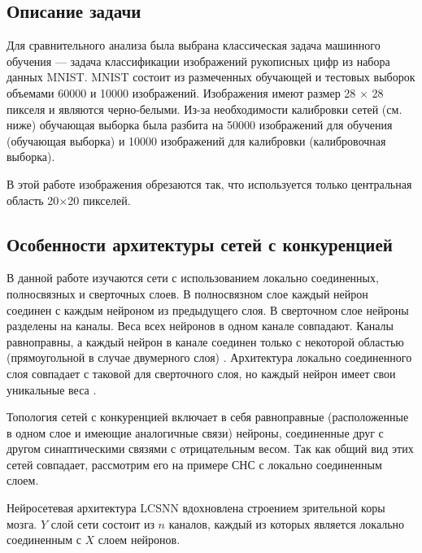 \documentclass[a4paper]{article}
\begin{document}
\subsection{Описание задачи}
Для сравнительного анализа была выбрана классическая задача машинного обучения --- задача классификации изображений рукописных цифр из набора данных MNIST. MNIST состоит из размеченных обучающей и тестовых выборок объемами 60000 и 10000 изображений. Изображения имеют размер 28 $\times$ 28 пикселя и являются черно-белыми. Из-за необходимости калибровки сетей (см. ниже) обучающая выборка была разбита на 50000 изображений для обучения (обучающая выборка) и 10000 изображений для калибровки (калибровочная выборка).

В этой работе изображения обрезаются так, что используется только центральная область 20$\times$20 пикселей.\\

\subsection{Особенности архитектуры сетей с конкуренцией}
В данной работе изучаются сети с использованием локально соединенных, полносвязных и сверточных слоев. В полносвязном слое каждый нейрон соединен с каждым нейроном из предыдущего слоя. В сверточном слое нейроны разделены на каналы. Веса всех нейронов в одном канале совпадают. Каналы равноправны, а каждый нейрон в канале соединен только с некоторой областью (прямоугольной в случае двумерного слоя) \cite{li2020survey}. Архитектура локально соединенного слоя совпадает с таковой для сверточного слоя, но каждый нейрон имеет свои уникальные веса \cite{saunders2019locally}.

Топология сетей с конкуренцией включает в себя равноправные (расположенные в одном слое и имеющие аналогичные связи) нейроны, соединенные друг с другом синаптическими связями с отрицательным весом. Так как общий вид этих сетей совпадает, рассмотрим его на примере СНС с локально соединенным слоем.

Нейросетевая архитектура LCSNN вдохновлена строением зрительной коры мозга. $Y$ слой сети состоит из $n$ каналов, каждый из которых является локально соединенным с $X$ слоем нейронов.
\end{document}
